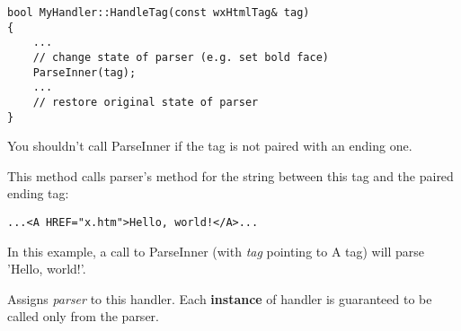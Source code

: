 
\begin{verbatim}
bool MyHandler::HandleTag(const wxHtmlTag& tag)
{
    ...
    // change state of parser (e.g. set bold face)
    ParseInner(tag);
    ...
    // restore original state of parser
}
\end{verbatim}

You shouldn't call ParseInner if the tag is not paired with an ending one.

\label{wxhtmltaghandlerparseinner}


This method calls parser's  method
for the string between this tag and the paired ending tag:

\begin{verbatim}
...<A HREF="x.htm">Hello, world!</A>...
\end{verbatim}

In this example, a call to ParseInner (with {\it tag} pointing to A tag)
will parse 'Hello, world!'.

\label{wxhtmltaghandlersetparser}


Assigns {\it parser} to this handler. Each {\bf instance} of handler 
is guaranteed to be called only from the parser.

